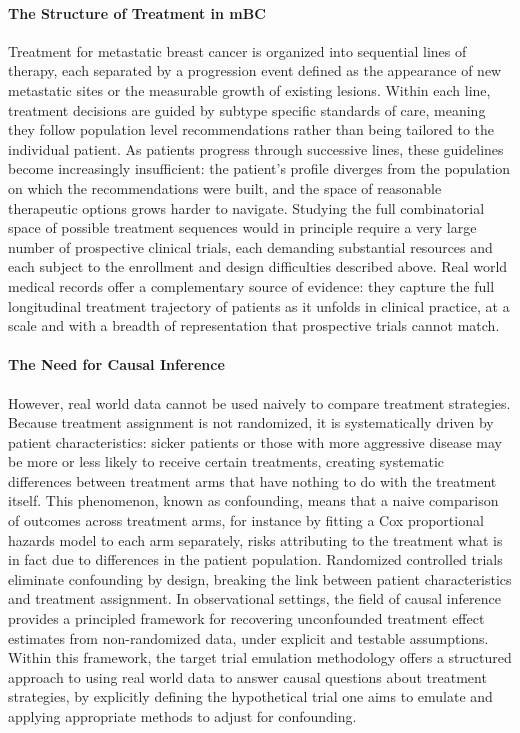 \documentclass[a4paper,10pt]{article}
\begin{document}
\paragraph{The Structure of Treatment in mBC}
Treatment for metastatic breast cancer is organized into sequential lines of therapy, each separated by a progression event defined as the appearance of new metastatic sites or the measurable growth of existing lesions. Within each line, treatment decisions are guided by subtype specific standards of care, meaning they follow population level recommendations rather than being tailored to the individual patient. As patients progress through successive lines, these guidelines become increasingly insufficient: the patient's profile diverges from the population on which the recommendations were built, and the space of reasonable therapeutic options grows harder to navigate. Studying the full combinatorial space of possible treatment sequences would in principle require a very large number of prospective clinical trials, each demanding substantial resources and each subject to the enrollment and design difficulties described above. Real world medical records offer a complementary source of evidence: they capture the full longitudinal treatment trajectory of patients as it unfolds in clinical practice, at a scale and with a breadth of representation that prospective trials cannot match.

\paragraph{The Need for Causal Inference}
However, real world data cannot be used naively to compare treatment strategies. Because treatment assignment is not randomized, it is systematically driven by patient characteristics: sicker patients or those with more aggressive disease may be more or less likely to receive certain treatments, creating systematic differences between treatment arms that have nothing to do with the treatment itself. This phenomenon, known as confounding, means that a naive comparison of outcomes across treatment arms, for instance by fitting a Cox proportional hazards model to each arm separately, risks attributing to the treatment what is in fact due to differences in the patient population. Randomized controlled trials eliminate confounding by design, breaking the link between patient characteristics and treatment assignment. In observational settings, the field of causal inference provides a principled framework for recovering unconfounded treatment effect estimates from non-randomized data, under explicit and testable assumptions. Within this framework, the target trial emulation methodology offers a structured approach to using real world data to answer causal questions about treatment strategies, by explicitly defining the hypothetical trial one aims to emulate and applying appropriate methods to adjust for confounding.
\end{document}

